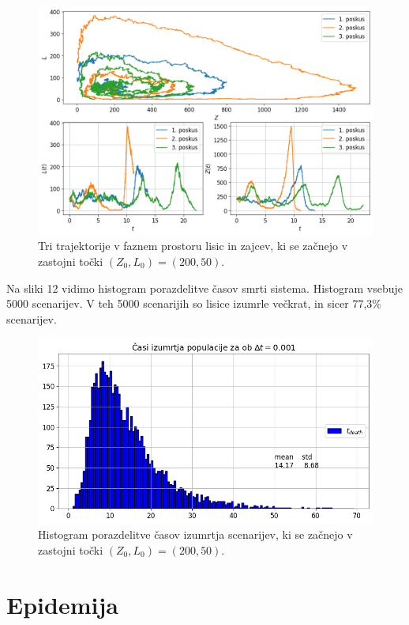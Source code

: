\documentclass[slovene,11pt,a4paper]{article}
\begin{document}
\newpage

\begin{figure}[h!]
\centering
\includegraphics[width=16cm]{slika11.png}
\caption{Tri trajektorije v faznem prostoru lisic in zajcev, ki se začnejo v zastojni točki $(Z_0, L_0)=(200, 50)$.}
\end{figure}

Na sliki 12 vidimo histogram porazdelitve časov smrti sistema. Histogram vsebuje 5000 scenarijev. V teh 5000 scenarijih so lisice izumrle večkrat, in sicer 77,3\% scenarijev.

\begin{figure}[h!]
\centering
\includegraphics[width=16cm]{slika12.png}
\caption{Histogram porazdelitve časov izumrtja scenarijev, ki se začnejo v zastojni točki $(Z_0, L_0)=(200, 50)$.}
\end{figure}

\section{Epidemija}
\end{document}
